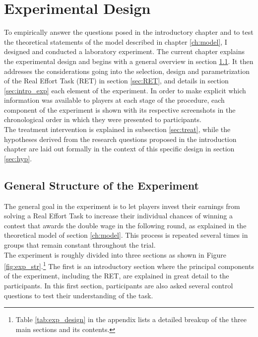     \chapter{Experimental Design}
    \label{ch:experiment}
    \thispagestyle{fancy}

    To empirically answer the questions posed in the introductory chapter and to test the theoretical statements of the model described in chapter \ref{ch:model}, I designed and conducted a laboratory experiment. The current chapter explains the experimental design and begins with a general overview in section \ref{sec:gen_str}. It then addresses the considerations going into the selection, design and parametrization of the Real Effort Task (RET) in section \ref{sec:RET}, and details in section \ref{sec:intro_exp} each element of the experiment. In order to make explicit which information was available to players at each stage of the procedure, each component of the experiment is shown with its respective screenshots in the chronological order in which they were presented to participants.\\
    
    The treatment intervention is explained in subsection \ref{sec:treat}, while the hypotheses derived from the research questions proposed in the introduction chapter are laid out formally in the context of this specific design in section \ref{sec:hyp}.
    
\section{General Structure of the Experiment}
\label{sec:gen_str}
    
    The general goal in the experiment is to let players invest their earnings from solving a Real Effort Task to increase their individual chances of winning a contest that awards the double wage in the following round, as explained in the theoretical model of section \ref{ch:model}. This process is repeated several times in groups that remain constant throughout the trial.\\ 
    

    The experiment is roughly divided into three sections as shown in Figure \ref{fig:exp_str}.\footnote{ Table \ref{tab:exp_design} in the appendix lists a detailed breakup of the three main sections and its contents.} The first is an introductory section where the principal components of the experiment, including the RET, are explained in great detail to the participants. In this first section, participants are also asked several control questions to test their understanding of the task.\\
    
